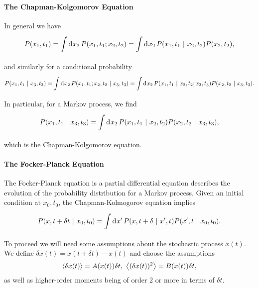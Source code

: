 \paragraph{The Chapman-Kolgomorov Equation}
In general we have
\begin{align*}
	P(x_{1}, t_{1}) = \int\limits_{}^{}\dd[]{x_{2}}P(x_{1}, t_{1}; x_{2}, t_{2}) = \int\limits_{}^{}\dd[]{x_{2}}P(x_{1}, t_{1} \ | \  x_{2}, t_{2})P(x_{2}, t_{2}),
\end{align*}
and similarly for a conditional probability
\begin{align*}
	P(x_{1}, t_{1} \ | \  x_{3}, t_{3}) = \int\limits_{}^{}\dd[]{x_{2}}P(x_{1}, t_{1}; x_{2}, t_{2} \ | \  x_{3}, t_{3}) = \int\limits_{}^{}\dd[]{x_{2}}P(x_{1}, t_{1} \ | \  x_{2}, t_{2}; x_{3}, t_{3})P(x_{2}, t_{2} \ | \  x_{3}, t_{3}).
\end{align*}
In particular, for a Markov process, we find
\begin{align*}
	P(x_{1}, t_{1} \ | \  x_{3}, t_{3}) = \int\limits_{}^{}\dd[]{x_{2}}P(x_{1}, t_{1} \ | \  x_{2}, t_{2})P(x_{2}, t_{2} \ | \  x_{3}, t_{3}),
\end{align*}
which is the Chapman-Kolgomorov equation.

\paragraph{The Focker-Planck Equation}
The Focker-Planck equation is a partial differential equation describes the evolution of the probability distribution for a Markov process. Given an initial condition at $x_{0}, t_{0}$, the Chapman-Kolmogorov equation implies
\begin{align*}
	P(x, t + \delta t \ | \  x_{0}, t_{0}) = \int\limits_{}^{}\dd[]{x\ensuremath{^{\prime}}}P(x, t + \delta \ | \  x^{\prime}, t)P(x^{\prime}, t \ | \  x_{0}, t_{0}).
\end{align*}
To proceed we will need some assumptions about the stochastic process $x(t)$. We define $\delta x(t) = x(t + \delta t) - x(t)$ and choose the assumptions
\begin{align*}
	\expval{\delta x(t)} = A(x(t))\delta t,\ \expval{(\delta x(t))^{2}} = B(x(t))\delta t,
\end{align*}
as well as higher-order moments being of order 2 or more in terms of $\delta t$.

